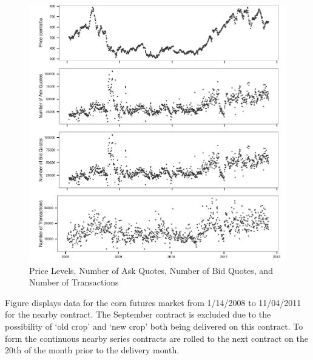 \documentclass[10pt,review]{elsarticle}
\begin{document}
\begin{figure}[htbp]
\centering
\includegraphics{TablesFigures_files/figure-latex/unnamed-chunk-3-1.pdf}
\caption{Price Levels, Number of Ask Quotes, Number of Bid Quotes, and
Number of Transactions}
\end{figure}

Figure displays data for the corn futures market from 1/14/2008 to
11/04/2011 for the nearby contract. The September contract is excluded
due to the possibility of `old crop' and `new crop' both being delivered
on this contract. To form the continuous nearby series contracts are
rolled to the next contract on the 20th of the month prior to the
delivery month.

\clearpage
\end{document}
